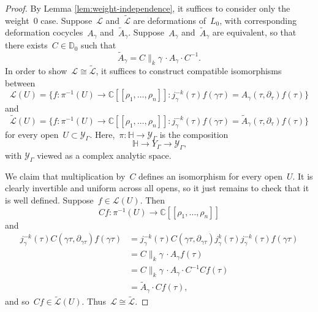 \documentclass[JEP,XML,SOM,Unicode,published]{cedram}
\theoremstyle{plain}
\theoremstyle{definition}
\newcommand{\tx}{\text}
\newcommand{\bbC}{\ensuremath{\mathbb{C}}}
\newcommand{\bbD}{\ensuremath{\mathbb{D}}}
\newcommand{\cL}{\ensuremath{\mathcal{L}}}
\newcommand{\cY}{\ensuremath{\mathcal{Y}}}
\let\wtd\widetilde
\newcommand{\defcol}{\mathrel{:}}
\newcommand{\condcol}{\mathrel{:}}
\newcommand{\llbrkt}{[\![}
\newcommand{\rrbrkt}{]\!]}
\newcommand{\HS}{\ensuremath{\mathbb{H}}}
\let\Ga\Gamma
\let\ga\gamma
\begin{document}
\begin{proof}
By Lemma \ref{lem:weight-independence}, it suffices to consider only the weight~$0$ case. Suppose~$\cL$ and~$\wtd{\cL}$ are deformations of~$L_0$, with corresponding deformation cocycles~$A_\ga$ and~$\wtd{A}_\ga$. Suppose~$A_\ga$ and~$\wtd{A}_\ga$ are equivalent, so that there exists~$C\in\bbD_0$ such that\vspace*{-3pt}
\begin{equation*}\wtd{A}_\ga = C\big\|_k\ga\,\cdot A_\ga\cdot C^{-1}\tx{.}\end{equation*}
In order to show~$\cL\cong \wtd{\cL}$, it suffices to construct compatible isomorphisms between
\begin{equation*}
\cL(U)
=
\big\{
f \defcol \pi^{-1}(U) \to \bbC\llbrkt \rho_1,\ldots,\rho_n\rrbrkt
\condcol
j_\ga^{-k}(\tau)f(\ga\tau) = A_\ga(\tau,\partial_\tau)f(\tau)
\big\}
\end{equation*}
and\vspace*{-3pt}
\begin{equation*}
\wtd{\cL}(U)
=
\big\{
f \defcol \pi^{-1}(U) \to \bbC\llbrkt \rho_1,\ldots,\rho_n\rrbrkt
\condcol
j_\ga^{-k}(\tau)f(\ga\tau) = \wtd{A}_\ga(\tau,\partial_\tau)f(\tau)
\big\}
\end{equation*}
for every open~$U\subset \cY_\Ga$. Here,~$\pi:\HS\to\cY_\Ga$ is the composition
\[
\HS\to Y_\Ga \to \cY_\Ga\tx{,}\]
with $\cY_\Ga$ viewed as a complex analytic space.

We claim that multiplication by~$C$ defines an isomorphism for every open~$U$. It is clearly invertible and uniform across all opens, so it just remains to check that it is well defined. Suppose~$f\in\cL(U)$. Then\vspace*{-3pt}
\begin{equation*} Cf:\pi^{-1}(U)\to\bbC\llbrkt \rho_1,\ldots,\rho_n\rrbrkt\end{equation*}
and\vspace*{-3pt}
\begin{align*}
j_\ga^{-k}(\tau)C(\ga\tau,\partial_{\ga\tau}) f(\ga\tau) &= j_{\ga}^{-k}(\tau)C(\ga\tau,\partial_{\ga\tau})j_\ga^{k}(\tau) j_\ga^{-k}(\tau) f(\ga\tau)\\
&= C\big\|_k\ga\, \cdot A_\ga f(\tau)\\
&= C\big\|_k\ga\, \cdot A_\ga \cdot C^{-1} Cf(\tau)\\
&= \wtd{A}_\ga \cdot Cf(\tau)\tx{,}
\end{align*}
and so~$Cf\in \wtd{\cL}(U)$. Thus~$\cL \cong \wtd{\cL}$.
\end{proof}
\end{document}
